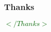 \documentclass{beamer}
\begin{document}
%
%
%

\begin{frame}
\frametitle{Thanks}
\begin{center}


\huge \textcolor{darkgreen}{$</Thanks>$} 
\end{center}

\end{frame}
\end{document}
